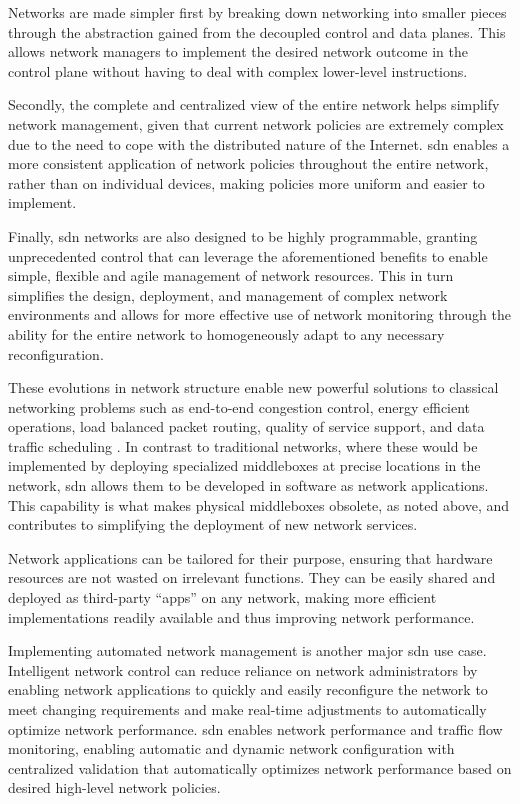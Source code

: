 Networks are made simpler first by breaking down networking into smaller pieces through the abstraction gained from the decoupled control and data planes. This allows network managers to implement the desired network outcome in the control plane without having to deal with complex lower-level instructions.

Secondly, the complete and centralized view of the entire network helps simplify network management\cite{bifulco_survey_2018}, given that current network policies are extremely complex due to the need to cope with the distributed nature of the Internet. \gls{sdn} enables a more consistent application of network policies throughout the entire network, rather than on individual devices, making policies more uniform and easier to implement.   \cite{nunes_survey_2014}

Finally, \gls{sdn} networks are also designed to be highly programmable, granting unprecedented control that can leverage the aforementioned benefits to enable simple, flexible and agile management of network resources. This in turn simplifies the design, deployment, and management of complex network environments and allows for more effective use of network monitoring through the ability for the entire network to homogeneously adapt to any necessary reconfiguration.

These evolutions in network structure enable new powerful solutions to classical networking problems such as end-to-end congestion control, energy efficient operations, load balanced packet routing, quality of service support, and data traffic scheduling \cite{xia_survey_2015}. In contrast to traditional networks, where these would be implemented by deploying specialized middleboxes at precise locations in the network, \gls{sdn} allows them to be developed in software as network applications. This capability is what makes physical middleboxes obsolete, as noted above, and contributes to simplifying the deployment of new network services.

Network applications can be tailored for their purpose, ensuring that hardware resources are not wasted on irrelevant functions\cite{bifulco_survey_2018}. They can be easily shared and deployed as third-party “apps” on any network\cite{nunes_survey_2014}\cite{kreutz_software-defined_2015}, making more efficient implementations readily available and thus improving network performance. 

Implementing automated network management is another major \gls{sdn} use case\cite{xia_survey_2015}\cite{li_protocol_2017}. Intelligent network control can reduce reliance on network administrators by enabling network applications to quickly and easily reconfigure the network to meet changing requirements and make real-time adjustments to automatically optimize network performance. \gls{sdn} enables network performance and traffic flow monitoring, enabling automatic and dynamic network configuration with centralized validation that automatically optimizes network performance based on desired high-level network policies. 

